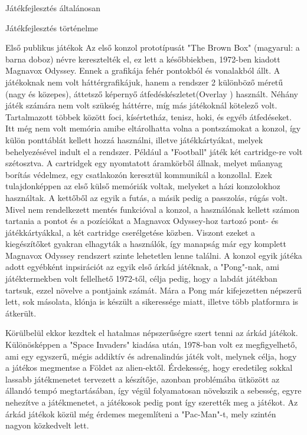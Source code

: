 \begin{MyChapter}{Játékfejlesztés általánosan}
\begin{MySection}{Játékfejlesztés történelme}
\begin{MySubSection}{Első publikus játékok}
		Az első konzol prototípusát "The Brown Box" (magyarul: a barna doboz) névre keresztelték el, ez lett a későbbiekben, 1972-ben kiadott Magnavox Odyssey. Ennek a grafikája fehér pontokból és vonalakból állt. A játékoknak nem volt háttérgrafikájuk, hanem a rendszer 2 különböző méretű (nagy és közepes), áttetsző képernyő átfedéskészletet(Overlay%
		) használt. Néhány játék számára nem volt szükség háttérre, míg más játékoknál kötelező volt. Tartalmazott többek között foci, kísértetház, tenisz, hoki, és egyéb átfedéseket. Itt még nem volt memória amibe eltárolhatta volna a pontszámokat a konzol, így külön ponttáblát kellett hozzá használni, illetve játékkártyákat, melyek behelyezésével indult el a rendszer. Például a "Football" játék két cartridge-re volt szétosztva. A cartridgek egy nyomtatott áramkörből állnak, melyet műanyag borítás védelmez, egy csatlakozón keresztül kommunikál a konzollal. Ezek tulajdonképpen az első külső memóriák voltak, melyeket a házi konzolokhoz használtak. A kettőből az egyik a futás, a másik pedig a passzolás, rúgás volt. Mivel nem rendelkezett mentés funkcióval a konzol, a használónak kellett számon tartania a pontot és a pozíciókat a Magnavox Odyssey-hoz tartozó pont- és játékkártyákkal, a két cartridge cserélgetése közben. Viszont ezeket a kiegészítőket gyakran elhagyták a használók, így manapság már egy komplett Magnavox Odyssey rendszert szinte lehetetlen lenne találni. A konzol egyik játéka adott egyébként inpsirációt az egyik első árkád játéknak, a "Pong"-nak, ami játéktermekben volt fellelhető 1972-től, célja pedig, hogy a labdát játékban tartsuk, ezzel növelve a pontjaink számát. Mára a Pong már kifejezetten népszerű lett, sok másolata, klónja is készült a sikeressége miatt, illetve több platformra is átkerült.
		
		
		Körülbelül ekkor kezdtek el hatalmas népszerűségre szert tenni az árkád játékok. Különösképpen a "Space Invaders" kiadása után, 1978-ban volt ez megfigyelhető, ami egy egyszerű, mégis addiktív és adrenalindús játék volt, melynek célja, hogy a játékos megmentse a Földet az alien-ektől. Érdekesség, hogy eredetileg sokkal lassabb játékmenetet tervezett a készítője, azonban problémába ütközött az állandó tempó megtartásában, így végül folyamatosan növekszik a sebesség, egyre nehezítve a játékmenetet, a játékosok pedig pont így szerették meg a játékot. Az árkád játékok közül még érdemes megemlíteni a "Pac-Man"-t, mely szintén nagyon közkedvelt lett.


\end{MySubSection}
\end{MySection}
\end{MyChapter}
